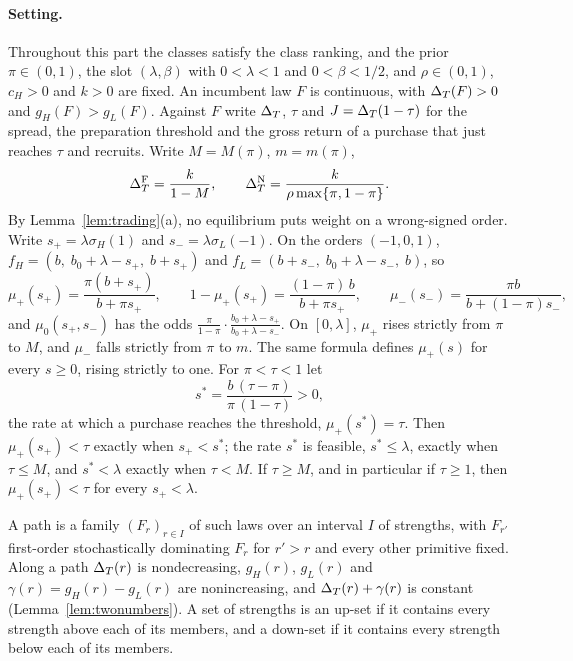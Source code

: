 \paragraph{Setting.}
Throughout this part the classes satisfy the class ranking, and the prior \(\pi\in(0,1)\), the slot
\((\lambda,\beta)\) with \(0<\lambda<1\) and \(0<\beta<1/2\), and \(\rho\in(0,1)\), \(c_H>0\) and \(k>0\) are fixed. An
incumbent law \(F\) is continuous, with \(\Delta_T(F)>0\) and \(g_H(F)>g_L(F)\). Against \(F\) write \(\Delta_T\), \(\tau\) and
\(J=\Delta_T(1-\tau)\) for the spread, the preparation threshold and the gross return of a purchase that just reaches
\(\tau\) and recruits. Write \(M=M(\pi)\), \(m=m(\pi)\),
\[
\Delta_T^{\rm F}=\frac{k}{1-M},\qquad \Delta_T^{\rm N}=\frac{k}{\rho\max\{\pi,1-\pi\}} .
\]
By Lemma~\ref{lem:trading}(a), no equilibrium puts weight on a wrong-signed order. Write \(s_+=\lambda\sigma_H(1)\) and
\(s_-=\lambda\sigma_L(-1)\). On the orders \((-1,0,1)\), \(f_H=(b,\;b_0+\lambda-s_+,\;b+s_+)\) and
\(f_L=(b+s_-,\;b_0+\lambda-s_-,\;b)\), so
\[
\mu_+(s_+)=\frac{\pi(b+s_+)}{b+\pi s_+},\qquad 1-\mu_+(s_+)=\frac{(1-\pi)\,b}{b+\pi s_+},\qquad
\mu_-(s_-)=\frac{\pi b}{b+(1-\pi)s_-},
\]
and \(\mu_0(s_+,s_-)\) has the odds \(\frac{\pi}{1-\pi}\cdot\frac{b_0+\lambda-s_+}{b_0+\lambda-s_-}\). On \([0,\lambda]\),
\(\mu_+\) rises strictly from \(\pi\) to \(M\), and \(\mu_-\) falls strictly from \(\pi\) to \(m\). The same formula
defines \(\mu_+(s)\) for every \(s\ge0\), rising strictly to one. For \(\pi<\tau<1\) let
\[
s^*=\frac{b\,(\tau-\pi)}{\pi\,(1-\tau)}>0 ,
\]
the rate at which a purchase reaches the threshold, \(\mu_+(s^*)=\tau\). Then \(\mu_+(s_+)<\tau\) exactly when
\(s_+<s^*\); the rate \(s^*\) is feasible, \(s^*\le\lambda\), exactly when \(\tau\le M\), and \(s^*<\lambda\) exactly when
\(\tau<M\). If \(\tau\ge M\), and in particular if \(\tau\ge1\), then \(\mu_+(s_+)<\tau\) for every \(s_+<\lambda\).

A path is a family \((F_r)_{r\in I}\) of such laws over an interval \(I\) of strengths, with \(F_{r'}\) first-order
stochastically dominating \(F_r\) for \(r'>r\) and every other primitive fixed. Along a path \(\Delta_T(r)\) is
nondecreasing, \(g_H(r)\), \(g_L(r)\) and \(\gamma(r)=g_H(r)-g_L(r)\) are nonincreasing, and \(\Delta_T(r)+\gamma(r)\) is
constant (Lemma~\ref{lem:twonumbers}). A set of strengths is an up-set if it contains every strength above each of
its members, and a down-set if it contains every strength below each of its members.

